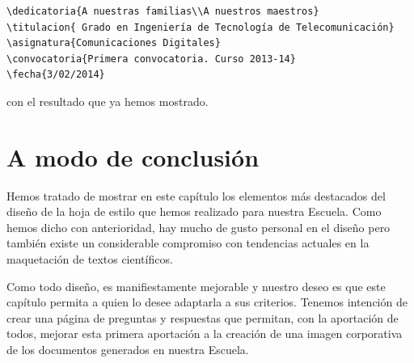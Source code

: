 \begin{lstlisting}[frame=none]
\dedicatoria{A nuestras familias\\A nuestros maestros} 
\titulacion{ Grado en Ingeniería de Tecnología de Telecomunicación}
\asignatura{Comunicaciones Digitales}
\convocatoria{Primera convocatoria. Curso 2013-14}
\fecha{3/02/2014}
\end{lstlisting}
%
con el resultado que ya hemos mostrado.

\section{A modo de conclusión}
Hemos tratado de mostrar en este capítulo los elementos más destacados del diseño de la hoja de estilo que hemos realizado para nuestra Escuela. Como hemos dicho con anterioridad, hay mucho de gusto personal en el diseño pero también existe un considerable compromiso con tendencias actuales en la maquetación de textos científicos. 

Como todo diseño, es manifiestamente mejorable y nuestro deseo es que este capítulo permita a quien lo desee adaptarla a sus criterios. Tenemos intención de crear una página de preguntas y respuestas que permitan, con la aportación de todos, mejorar esta primera aportación a la creación de una imagen corporativa de los documentos generados en nuestra Escuela.

 


